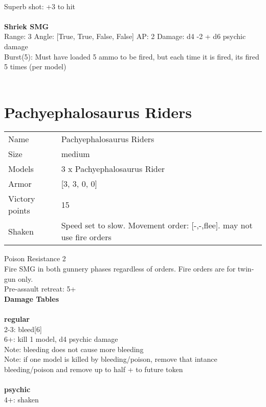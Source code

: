 \ \\
Superb shot: +3 to hit\\ 

\ \\
{\bf Shriek SMG } \\



Range: 3  Angle: [True, True, False, False] AP: 2 Damage: d4 -2 + d6 psychic damage \\
Burst(5): Must have loaded 5 ammo to be fired, but each time it is fired, its fired 5 times (per model)\\ 




 
\ \\














\pagebreak\clearpage

\section{ Pachyephalosaurus Riders }

\begin{tabular}{ll}
  Name & Pachyephalosaurus Riders \\
  Size & medium\\
  Models & 3 x Pachyephalosaurus Rider\\
  Armor & [3, 3, 0, 0]\\
  Victory points & 15\\
  Shaken & Speed set to slow. Movement order: [-,-,flee]. may not use fire orders\\
\end{tabular}

Poison Resistance 2\\ 
Fire SMG in both gunnery phases regardless of orders. Fire orders are for twin-gun only.\\ 
Pre-assault retreat: 5+\\ 



{\bf Damage Tables} \\
\ \\ {\bf regular } \\
2-3: bleed[6] \\
6+: kill 1 model, d4 psychic damage \\
Note: bleeding does not cause more bleeding \\
Note: if one model is killed by bleeding/poison, remove that intance \\ bleeding/poison and remove up to half + to future token \\
\ \\ {\bf psychic } \\
4+: shaken \\


